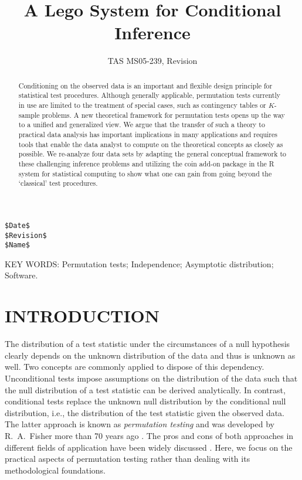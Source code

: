 \documentclass{article}
\newcommand{\Rpackage}[1]{{\normalfont\fontseries{b}\selectfont #1}}
\newcommand{\RR}{\textsf{R}}
\begin{document}
\title{A Lego System for Conditional Inference}

\author{TAS MS05-239, Revision}

\date{}

\maketitle

\thispagestyle{empty}


\noindent
\begin{verbatim}
$Date$ 
$Revision$ 
$Name$
\end{verbatim}


\begin{abstract}
Conditioning on the observed data is an important and flexible 
design principle for statistical test procedures. Although generally
applicable, permutation tests currently in use are limited to 
the treatment of special cases, such as contingency tables or $K$-sample
problems. A new theoretical framework for permutation
tests opens up the way to a unified and generalized view. We argue that the
transfer of such a theory to practical data analysis has important
implications in many applications and requires tools that enable the
data analyst to compute on the theoretical concepts as closely as possible.
We re-analyze four data sets
by adapting the general conceptual framework to these challenging inference
problems and
utilizing the \Rpackage{coin} add-on package in the \RR{} system for statistical computing
to show what one can gain from going beyond the `classical' test procedures.
\end{abstract}

\noindent
KEY WORDS: Permutation tests; Independence; Asymptotic distribution; Software.
\newline



\section{INTRODUCTION}

The distribution of a test statistic under the circumstances of a 
null hypothesis clearly depends on the unknown distribution of the data and
thus is unknown as well.
Two concepts are commonly applied to dispose of this dependency.
Unconditional tests impose assumptions on the distribution of the data such
that the null distribution of a test statistic can be derived analytically. In contrast, 
conditional tests
replace the unknown null distribution by the conditional null distribution,
i.e., the distribution of the test statistic given the observed data. The
latter approach is known as \textit{permutation testing} and was developed
by R.~A.~Fisher more than 70 years ago \citep{Fisher1935}. 
The pros and cons of both approaches in different fields of application 
have been widely discussed \citep[e.g.~by][]{why-permut:1998,pros-and-c:2000,Shuster2005}.
Here, we focus on the practical aspects of permutation testing rather than
dealing with its methodological foundations.
\end{document}
